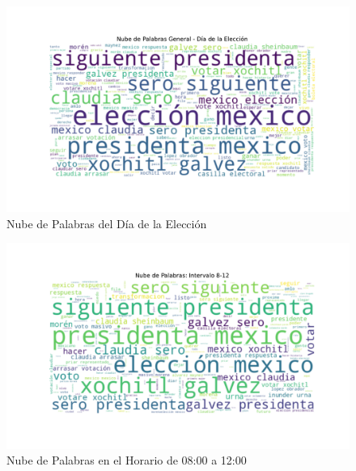 \documentclass[10pt, a4paper]{article}
\begin{document}
	
	\vspace{-4mm}
	\begin{figure}[h!]
		\centering
		\includegraphics[width=1\textwidth]{nube_general_eleccion.pdf} %
		\vspace{-22mm}
		\caption{Nube de Palabras del Día de la Elección}
		\label{fig:nubeDiaEleccion} %
	\end{figure}
	
	\newpage
	\vspace{-5mm}
	\begin{figure}[h!]
		\centering
		\includegraphics[width=1\textwidth]{nube_intervalo_8-12.pdf} %
		\vspace{-22mm}
		\caption{Nube de Palabras en el Horario de 08:00 a 12:00}
		\label{fig:nubeIntervalo812} %
	\end{figure}
	
\end{document}
